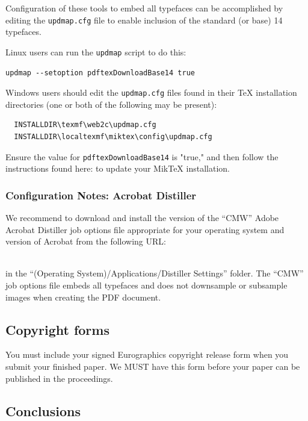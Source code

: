 \documentclass{egpubl}
\begin{document}
\noindent
Configuration of these tools to embed all typefaces can be accomplished by editing the \texttt{updmap.cfg} file
to enable inclusion of the standard (or base) 14 typefaces.

Linux users can run the \texttt{updmap} script to do this:
\begin{verbatim}
updmap --setoption pdftexDownloadBase14 true
\end{verbatim}

Windows users should edit the \texttt{updmap.cfg} files found in their TeX installation directories (one or both
of the following may be present):
\begin{verbatim}
  INSTALLDIR\texmf\web2c\updmap.cfg
  INSTALLDIR\localtexmf\miktex\config\updmap.cfg
\end{verbatim}

Ensure the value for \texttt{pdftexDownloadBase14} is "true," and then follow the instructions found here:
 to update your MikTeX installation.

\subsubsection*{Configuration Notes: Acrobat Distiller}

We recommend to download and install the version of the ``CMW'' Adobe Acrobat Distiller job options file
appropriate for your operating system and version of Acrobat from the following URL:

\\
in the ``(Operating System)/Applications/Distiller Settings'' folder. The ``CMW'' job options file embeds
all typefaces and does not downsample or subsample images when creating the PDF document.
\subsection{Copyright forms}

You must include your signed Eurographics copyright release form
when you submit your finished paper. We MUST have this form before
your paper can be published in the proceedings.

\subsection{Conclusions}
\end{document}
